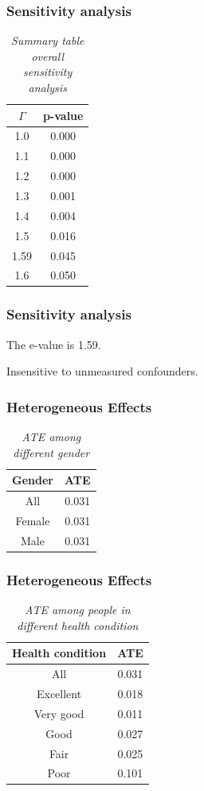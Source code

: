 \documentclass[10pt, handout]{beamer} %
\begin{document}
\frame
{
\frametitle{Sensitivity analysis}
\vskip 0.1in  

\begin{table}[!ht] %
\centering
\caption{\textsl{Summary table overall sensitivity analysis}}
\label{Table-1}
\begin{tabular}{|c|c|}
\hline
$\Gamma$ & p-value \\
\hline
1.0 & 0.000 \\
\hline
1.1 & 0.000 \\
\hline
1.2 & 0.000 \\
\hline
1.3 & 0.001 \\
\hline
1.4 & 0.004 \\
\hline
1.5 & 0.016 \\
\hline
1.59 & 0.045 \\
\hline
1.6 & 0.050 \\
\hline
\end{tabular}
\end{table}
}

\frame
{
\frametitle{Sensitivity analysis}
\vskip 0.1in 

\begin{itemize}
{
  
\item The e-value is 1.59.

\vskip 0.3in  

\item Insensitive to unmeasured confounders.

}
\end{itemize}
}

\frame
{
\frametitle{Heterogeneous Effects}
\vskip 0.1in 

\begin{table}[!ht] %
\centering
\caption{\textsl{ATE among different gender}}
\label{Table-2}
\begin{tabular}{|c|c|}
\hline
Gender & ATE \\
\hline
All & 0.031 \\
\hline
Female & 0.031 \\
\hline
Male & 0.031 \\
\hline
\end{tabular}
\end{table}
}

\frame
{
\frametitle{Heterogeneous Effects}
\vskip 0.1in 

\begin{table}[!ht] %
\centering
\caption{\textsl{ATE among people in different health condition}}
\label{Table-3}
\begin{tabular}{|c|c|}
\hline
Health condition & ATE \\
\hline
All & 0.031 \\
\hline
Excellent & 0.018 \\
\hline
Very good & 0.011 \\
\hline
Good & 0.027 \\
\hline
Fair & 0.025 \\
\hline
Poor & 0.101 \\
\hline
\end{tabular}
\end{table}
}
\end{document}
